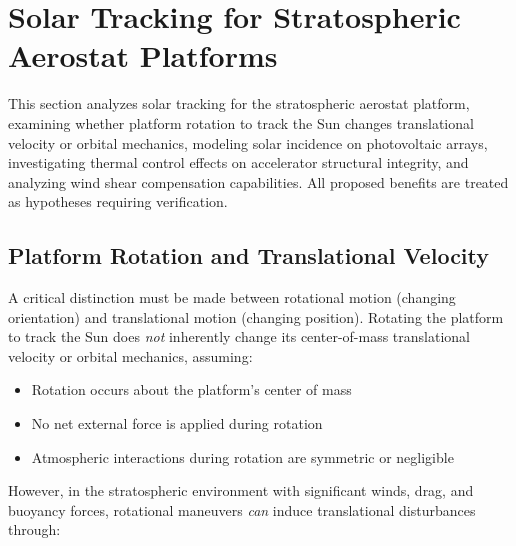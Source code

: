 \section{Solar Tracking for Stratospheric Aerostat Platforms}
\label{sec:solar_tracking}

This section analyzes solar tracking for the stratospheric aerostat platform, examining whether platform rotation to track the Sun changes translational velocity or orbital mechanics, modeling solar incidence on photovoltaic arrays, investigating thermal control effects on accelerator structural integrity, and analyzing wind shear compensation capabilities. All proposed benefits are treated as hypotheses requiring verification.

\subsection{Platform Rotation and Translational Velocity}
A critical distinction must be made between rotational motion (changing orientation) and translational motion (changing position). Rotating the platform to track the Sun does \emph{not} inherently change its center-of-mass translational velocity or orbital mechanics, assuming:
\begin{itemize}
    \item Rotation occurs about the platform's center of mass
    \item No net external force is applied during rotation
    \item Atmospheric interactions during rotation are symmetric or negligible
\end{itemize}
However, in the stratospheric environment with significant winds, drag, and buoyancy forces, rotational maneuvers \emph{can} induce translational disturbances through:

